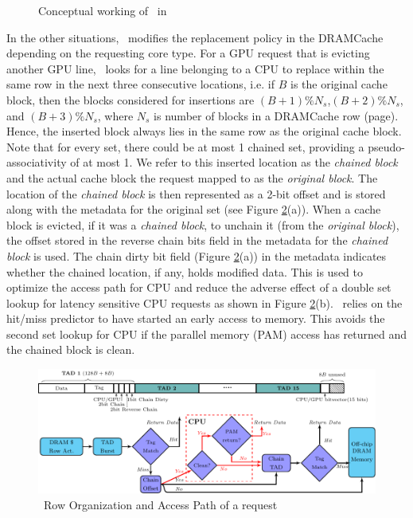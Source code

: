 \begin{figure}
	\centering
	\def\svgwidth{0.45\linewidth}
	
	\caption{Conceptual working of \chaining\ in \cachename}
	\label{fig:chaining-concept}
\end{figure}

In the other situations, \cachename\ modifies the replacement policy in the DRAMCache depending on the requesting core type. For a GPU request that is evicting another GPU line, \cachename\ looks for a line belonging to a CPU to replace within the same row in the next three consecutive locations,
i.e. if $B$ is the original cache block, then the blocks considered for insertions are $(B+1)\%N_s$,$(B+2)\%N_s$, and $(B+3)\%N_s$, where $N_s$ is number of blocks in a DRAMCache row (page). Hence, the inserted block always lies in the same row as the original cache block. Note that for every set, there could be at most 1 chained set, providing a pseudo-associativity of at most 1.  
We refer to this inserted location as the \textit{chained block} and the actual cache block the request mapped to as the \textit{original block}. The location of the \textit{chained block} is then represented as a 2-bit offset and is stored along with the metadata for the original set (see Figure \ref{fig:chain-access}(a)). When a cache block is evicted, if it was a \textit{chained block}, to unchain it (from the \textit{original block}), the offset stored in the reverse chain bits field in the metadata for the \textit{chained block} is used.  
The chain dirty bit field (Figure \ref{fig:chain-access}(a)) in the metadata indicates whether the chained location, if any, holds modified data. This is used to optimize the access path for CPU and reduce the adverse effect of a double set lookup for latency sensitive CPU requests as shown in Figure \ref{fig:chain-access}(b). \chaining\ relies on the hit/miss predictor to have started an early access to memory. This avoids the second set lookup for CPU if the parallel memory (PAM) access has returned and the chained block is clean. 


\begin{figure}[htb]
	\centering
	\includegraphics[scale=0.96]{figures/chaining}
	\caption{\cachename\ Row Organization and Access Path of a request}	
	\label{fig:chain-access}
\end{figure}

